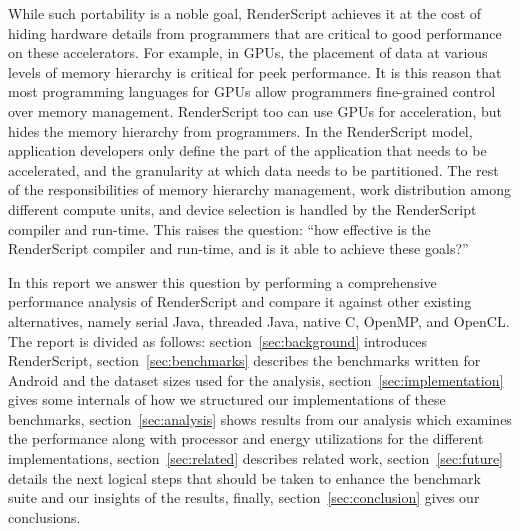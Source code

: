While such portability is a noble goal, RenderScript achieves it at the cost of
hiding hardware details from programmers that are critical to good
performance on these accelerators. For example, in GPUs, the placement of data at
various levels of memory hierarchy is critical for peek performance.  It is this
reason that most programming languages for GPUs allow programmers fine-grained
control over memory management. RenderScript too can use GPUs for acceleration,
but hides the memory hierarchy from programmers. In the
RenderScript model, application developers only define the part of the
application that needs to be accelerated, and the granularity at which data
needs to be partitioned. The rest of the responsibilities of memory
hierarchy management, work distribution among different compute units, and device selection
is handled by the RenderScript compiler and run-time. 
This raises the question: ``how
effective is the RenderScript compiler and run-time, and is it able to achieve these goals?''

In this report we answer this question 
by performing a comprehensive performance analysis of RenderScript and compare
it against other existing alternatives, namely
serial Java, threaded Java, native C, OpenMP, and OpenCL.
The report is divided as follows: section~\ref{sec:background} introduces 
RenderScript, section~\ref{sec:benchmarks} describes the benchmarks written for
Android and the dataset sizes
used for the analysis,
section~\ref{sec:implementation} gives some internals of how we structured our
implementations of these benchmarks,
section~\ref{sec:analysis} shows results from our analysis which
examines the performance along with processor and energy utilizations for the
different implementations,
section~\ref{sec:related} describes related work,
section~\ref{sec:future} details the next logical steps that should be taken to
enhance the benchmark suite and our insights of the results,
finally, section~\ref{sec:conclusion} gives our conclusions.
